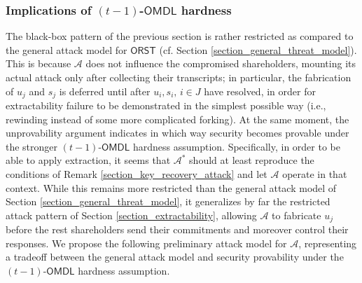 \documentclass[psamsfonts, reqno]{amsart}
\theoremstyle{definition}
\theoremstyle{remark}
\numberwithin{equation}{section}
\begin{document}
\subsubsection{Implications of $(t-1)$-$\mathsf{OMDL}$ hardness}\label{section_implications}

The black-box pattern of the previous section
is rather restricted as compared to
the general attack model for $\mathsf{ORST}$
(cf. Section \ref{section_general_threat_model}).
This is because $\mathcal{A}$ does
not influence the compromised shareholders,
mounting its actual attack only after collecting their
transcripts; in particular,
the fabrication of $u_j$ and $s_j$
is deferred until after $u_i, s_i,\hspace{2pt} i \in J$
have resolved,
in order for extractability failure
to be demonstrated in the simplest possible way
(i.e., rewinding instead of some more complicated forking).
At the same moment, the unprovability argument
indicates in which way security becomes provable under
the stronger $(t-1)$-$\mathsf{OMDL}$ hardness assumption.
Specifically, in order to be able to apply extraction,
it seems that $\mathcal{A}^*$ should at least reproduce
the conditions of Remark \ref{section_key_recovery_attack}
and let $\mathcal{A}$ operate in that context.
While this remains more restricted than the general attack model
of Section \ref{section_general_threat_model},
it generalizes by far the restricted attack pattern of Section
\ref{section_extractability}, allowing
$\mathcal{A}$ to fabricate $u_j$ before the rest shareholders
send their commitments and moreover control their responses.
We propose the following preliminary attack model for $\mathcal{A}$,
representing a tradeoff between the general attack model
and security provability
under the $(t-1)$-$\mathsf{OMDL}$ hardness assumption.
\end{document}
